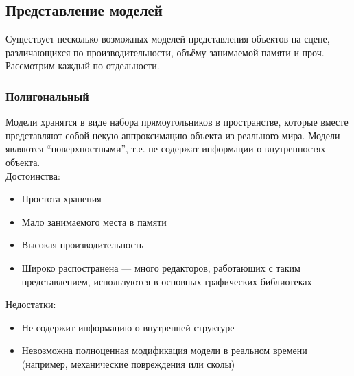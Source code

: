 \documentclass[a4paper,12pt]{report}
\numberwithin{equation}{section}
\begin{document}
\subsection{Представление моделей} \label{model_reasoning_section}
Существует несколько возможных моделей представления объектов на сцене, различающихся по производительности, объёму занимаемой памяти и проч. Рассмотрим каждый по отдельности.

\subsubsection*{Полигональный}
Модели хранятся в виде набора прямоугольников в пространстве, которые вместе представляют собой некую аппроксимацию объекта из реального мира. Модели являются ``поверхностными'', т.е. не содержат информации о внутренностях объекта. \autocite{mayaguide} \\
Достоинства:
\begin{itemize}
\item Простота хранения
\item Мало занимаемого места в памяти
\item Высокая производительность
\item Широко распостранена --- много редакторов, работающих с таким представлением, используются в основных графических библиотеках
\end{itemize}
Недостатки:
\begin{itemize}
\item Не содержит информацию о внутренней структуре
\item Невозможна полноценная модификация модели в реальном времени (например, механические повреждения или сколы)
\end{itemize}
\end{document}
